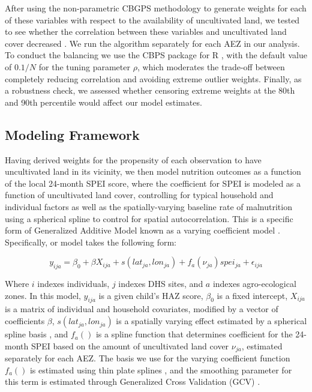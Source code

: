 \documentclass[titlepage]{article}
\begin{document}
After using the non-parametric CBGPS methodology to generate weights for each of these variables with respect to the availability of uncultivated land, we tested to see whether the correlation between these variables and uncultivated land cover decreased \citep{Fong2018}.  We run the algorithm separately for each AEZ in our analysis.  To conduct the balancing we use the CBPS package for R \citep{Fong2018a}, with the default value of $0.1/N$ for the tuning parameter $\rho$, which moderates the trade-off between completely reducing correlation and avoiding extreme outlier weights.  Finally, as a robustness check, we assessed whether censoring extreme weights at the 80th and 90th percentile would affect our model estimates.

\subsection{Modeling Framework}
Having derived weights for the propensity of each observation to have uncultivated land in its vicinity, we then model nutrition outcomes as a function of the local 24-month SPEI score, where the coefficient for SPEI is modeled as a function of uncultivated land cover, controlling for typical household and individual factors as well as the spatially-varying baseline rate of malnutrition using a spherical spline to control for spatial autocorrelation.  This is a specific form of Generalized Additive Model \citep{Hastie1986} known as a varying coefficient model \citep{Wood2017}.  Specifically, or model takes the following form:

\begin{equation}
  y_{ija} = \beta_0 + \beta X_{ija} + s(lat_{ja}, lon_{ja}) + f_{a}(\nu_{ja}) spei_{ja} + \epsilon_{ija} \label{eqn:GAM}
\end{equation}

Where $i$ indexes individuals, $j$ indexes DHS sites, and $a$ indexes agro-ecological zones. In this model, $y_{ija}$ is a given child's HAZ score, $\beta_0$ is a fixed intercept, $X_{ija}$ is a matrix of individual and household covariates, modified by a vector of coefficients $\beta$, $s(lat_{ja}, lon_{ja})$ is a spatially varying effect estimated by a spherical spline basis \citep{Wahba1982}, and $f_{a}()$ is a spline function that determines coefficient for the 24-month SPEI based on the amount of uncultivated land cover $\nu_{ja}$, estimated separately for each AEZ.  The basis we use for the varying coefficient function $f_{a}()$ is estimated using thin plate splines \citep{Duchon1977}, and the smoothing parameter for this term is estimated through Generalized Cross Validation (GCV) \citep{Wood2017}.
\end{document}
